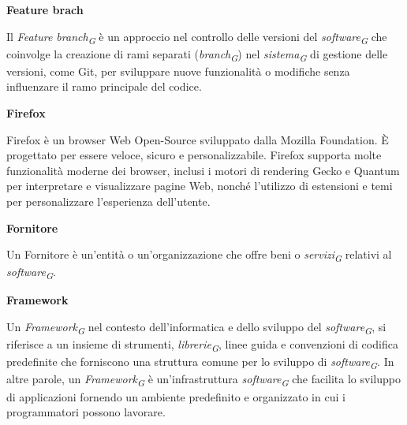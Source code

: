 \documentclass{article}
\begin{document}
\vspace{0.4cm}

\textbf{Feature brach}

\vspace{0.1cm}

Il \textit{Feature branch}\textsubscript{\textit{G}} è un approccio nel controllo delle versioni del \textit{software}\textsubscript{\textit{G}} che coinvolge la creazione di rami separati (\textit{branch}\textsubscript{\textit{G}}) nel \textit{sistema}\textsubscript{\textit{G}} di gestione delle versioni, come Git, per sviluppare nuove funzionalità o modifiche senza influenzare il ramo principale del codice.

\vspace{0.4cm}

\textbf{Firefox}

\vspace{0.1cm}

Firefox è un browser Web Open-Source sviluppato dalla Mozilla Foundation. È progettato per essere veloce, sicuro e personalizzabile. Firefox supporta molte funzionalità moderne dei browser, inclusi i motori di rendering Gecko e Quantum per interpretare e visualizzare pagine Web, nonché l'utilizzo di estensioni e temi per personalizzare l'esperienza dell'utente. 

\vspace{0.4cm}

\textbf{Fornitore}

\vspace{0.1cm}

Un Fornitore è un'entità o un'organizzazione che offre beni o \textit{servizi}\textsubscript{\textit{G}} relativi al \textit{software}\textsubscript{\textit{G}}.

\vspace{0.4cm}

\textbf{Framework}

\vspace{0.1cm}

Un \textit{Framework}\textsubscript{\textit{G}} nel contesto dell'informatica e dello sviluppo del \textit{software}\textsubscript{\textit{G}}, si riferisce a un insieme di strumenti, \textit{librerie}\textsubscript{\textit{G}}, linee guida e convenzioni di codifica predefinite che forniscono una struttura comune per lo sviluppo di \textit{software}\textsubscript{\textit{G}}. In altre parole, un \textit{Framework}\textsubscript{\textit{G}} è un'infrastruttura \textit{software}\textsubscript{\textit{G}} che facilita lo sviluppo di applicazioni fornendo un ambiente predefinito e organizzato in cui i programmatori possono lavorare.
\end{document}
